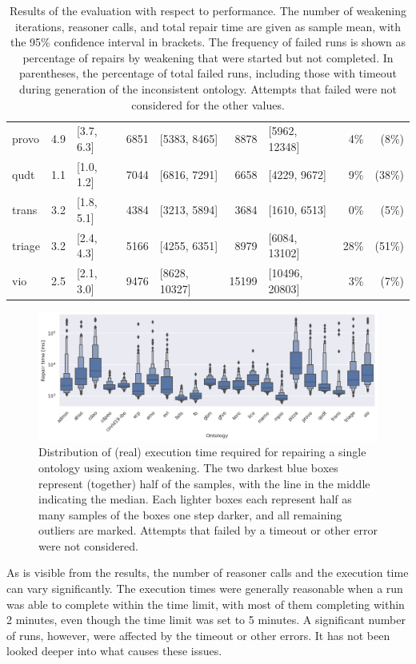\begin{table}[ht]
\begin{tabular}{|l|r@{ }lr@{ }lr@{ }lr@{ }r|}
    provo & 4.9 & [3.7, 6.3] & 6851 & [5383, 8465] & 8878 & [5962, 12348] & 4\% & (8\%) \\
    qudt & 1.1 & [1.0, 1.2] & 7044 & [6816, 7291] & 6658 & [4229, 9672] & 9\% & (38\%) \\
    trans & 3.2 & [1.8, 5.1] & 4384 & [3213, 5894] & 3684 & [1610, 6513] & 0\% & (5\%) \\
    triage & 3.2 & [2.4, 4.3] & 5166 & [4255, 6351] & 8979 & [6084, 13102] & 28\% & (51\%) \\
    vio & 2.5 & [2.1, 3.0] & 9476 & [8628, 10327] & 15199 & [10496, 20803] & 3\% & (7\%) \\
    \hline
  \end{tabular}
  \caption{Results of the evaluation with respect to performance. The number of weakening iterations, reasoner calls, and total repair time are given as sample mean, with the 95\% confidence interval in brackets. The frequency of failed runs is shown as percentage of repairs by weakening that were started but not completed. In parentheses, the percentage of total failed runs, including those with timeout during generation of the inconsistent ontology. Attempts that failed were not considered for the other values.}
  \label{table:results-perf}
\end{table}

\begin{figure}[ht]
  \centering
  \includegraphics[width=\textwidth]{resources/time-ontology-violin.png}
  \caption{Distribution of (real) execution time required for repairing a single ontology using axiom weakening. The two darkest blue boxes represent (together) half of the samples, with the line in the middle indicating the median. Each lighter boxes each represent half as many samples of the boxes one step darker, and all remaining outliers are marked. Attempts that failed by a timeout or other error were not considered.}
  \label{fig:results-perf-time}
\end{figure}

As is visible from the results, the number of reasoner calls and the execution time can vary significantly. The execution times were generally reasonable when a run was able to complete within the time limit, with most of them completing within 2 minutes, even though the time limit was set to 5 minutes. A significant number of runs, however, were affected by the timeout or other errors. It has not been looked deeper into what causes these issues.


